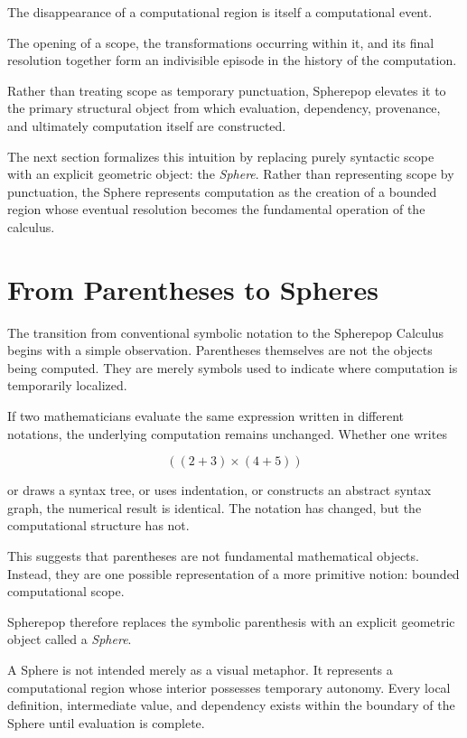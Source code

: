 \documentclass[12pt,oneside]{article}
\theoremstyle{definition}
\theoremstyle{remark}
\begin{document}
The disappearance of a computational region is itself a computational event.

The opening of a scope, the transformations occurring within it, and its final
resolution together form an indivisible episode in the history of the
computation.

Rather than treating scope as temporary punctuation, Spherepop elevates it to
the primary structural object from which evaluation, dependency, provenance,
and ultimately computation itself are constructed.

The next section formalizes this intuition by replacing purely syntactic scope
with an explicit geometric object: the \emph{Sphere}. Rather than representing
scope by punctuation, the Sphere represents computation as the creation of a
bounded region whose eventual resolution becomes the fundamental operation of
the calculus.

\section{From Parentheses to Spheres}

The transition from conventional symbolic notation to the Spherepop Calculus
begins with a simple observation. Parentheses themselves are not the objects
being computed. They are merely symbols used to indicate where computation is
temporarily localized.

If two mathematicians evaluate the same expression written in different
notations, the underlying computation remains unchanged. Whether one writes

\[
((2+3)\times(4+5))
\]

or draws a syntax tree, or uses indentation, or constructs an abstract syntax
graph, the numerical result is identical. The notation has changed, but the
computational structure has not.

This suggests that parentheses are not fundamental mathematical objects.
Instead, they are one possible representation of a more primitive notion:
bounded computational scope.

Spherepop therefore replaces the symbolic parenthesis with an explicit
geometric object called a \emph{Sphere}.

A Sphere is not intended merely as a visual metaphor. It represents a
computational region whose interior possesses temporary autonomy. Every local
definition, intermediate value, and dependency exists within the boundary of
the Sphere until evaluation is complete.
\end{document}
